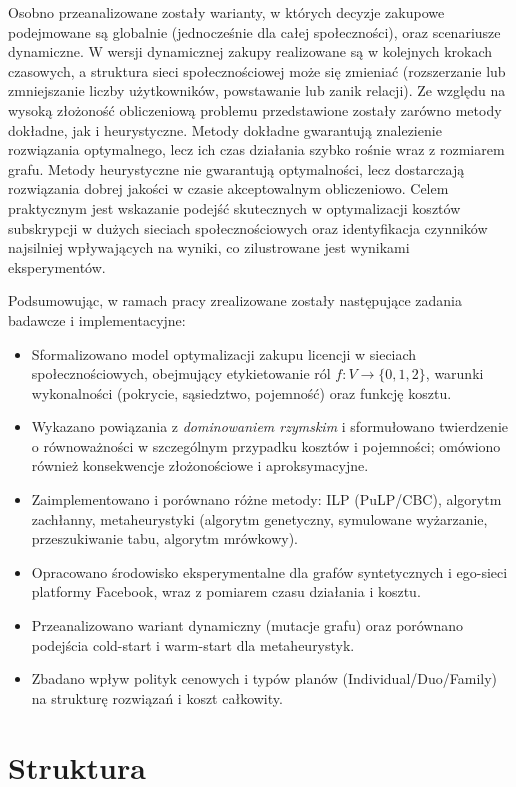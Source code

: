 Osobno przeanalizowane zostały warianty, w których decyzje zakupowe podejmowane są globalnie (jednocześnie dla całej społeczności), oraz scenariusze dynamiczne. W wersji dynamicznej zakupy realizowane są w kolejnych krokach czasowych, a struktura sieci społecznościowej może się zmieniać (rozszerzanie lub zmniejszanie liczby użytkowników, powstawanie lub zanik relacji). Ze względu na wysoką złożoność obliczeniową problemu przedstawione zostały zarówno metody dokładne, jak i heurystyczne. Metody dokładne gwarantują znalezienie rozwiązania optymalnego, lecz ich czas działania szybko rośnie wraz z rozmiarem grafu. Metody heurystyczne nie gwarantują optymalności, lecz dostarczają rozwiązania dobrej jakości w czasie akceptowalnym obliczeniowo. Celem praktycznym jest wskazanie podejść skutecznych w optymalizacji kosztów subskrypcji w dużych sieciach społecznościowych oraz identyfikacja czynników najsilniej wpływających na wyniki, co zilustrowane jest wynikami eksperymentów.

Podsumowując, w ramach pracy zrealizowane zostały następujące zadania badawcze i implementacyjne:
\begin{itemize}
  \item Sformalizowano model optymalizacji zakupu licencji w sieciach społecznościowych, obejmujący etykietowanie ról $f:V\to\{0,1,2\}$, warunki wykonalności (pokrycie, sąsiedztwo, pojemność) oraz funkcję kosztu.
  \item Wykazano powiązania z \emph{dominowaniem rzymskim} i sformułowano twierdzenie o równoważności w szczególnym przypadku kosztów i pojemności; omówiono również konsekwencje złożonościowe i aproksymacyjne.
  \item Zaimplementowano i porównano różne metody: ILP (PuLP/CBC), algorytm zachłanny, metaheurystyki (algorytm genetyczny, symulowane wyżarzanie, przeszukiwanie tabu, algorytm mrówkowy).
  \item Opracowano środowisko eksperymentalne dla grafów syntetycznych i ego-sieci platformy Facebook, wraz z pomiarem czasu działania i kosztu.
  \item Przeanalizowano wariant dynamiczny (mutacje grafu) oraz porównano podejścia cold-start i warm-start dla metaheurystyk.
  \item Zbadano wpływ polityk cenowych i typów planów (Individual/Duo/Family) na strukturę rozwiązań i koszt całkowity.
\end{itemize}

\section{Struktura}

